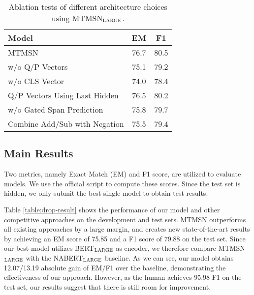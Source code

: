 \documentclass[11pt,a4paper]{article}
\newcommand\bertlarge{BERT$_{\textsc{LARGE}}$\xspace}
\newcommand\nabertlarge{NABERT$_{\textsc{LARGE}}$\xspace}
\newcommand\mtmsnlarge{MTMSN$_{\textsc{LARGE}}$\xspace}
\begin{document}
\begin{table}
	\begin{center}
		\begin{tabular}{l|cc}
			\toprule
			Model & EM & F1 \\ 
			\midrule
			MTMSN                & 76.7 & 80.5  \\
			w/o Q/P Vectors            & 75.1 &  79.2 \\
			w/o CLS Vector              & 74.0 & 78.4  \\
			Q/P Vectors Using Last Hidden          & 76.5 & 80.2  \\
w/o Gated Span Prediction	     & 75.8 & 79.7  \\
			Combine Add/Sub with Negation  & 75.5 & 79.4  \\
			\bottomrule
		\end{tabular}
		\caption{\label{table:ablation2} Ablation tests of different architecture choices using \mtmsnlarge.}
	\end{center}
\end{table}

\subsection{Main Results}
Two metrics, namely Exact Match (EM) and F1 score, are utilized to evaluate models.
We use the official script to compute these scores. 
Since the test set is hidden, we only submit the best single model to obtain test results.

Table \ref{table:drop-result} shows the performance of our model and other competitive approaches on the development and test sets. 
MTMSN outperforms all existing approaches by a large margin, and creates new state-of-the-art results by achieving an EM score of 75.85 and a F1 score of 79.88 on the test set. 
Since our best model utilizes \bertlarge as encoder, we therefore compare \mtmsnlarge with the \nabertlarge baseline.
As we can see, our model obtains 12.07/13.19 absolute gain of EM/F1 over the baseline, demonstrating the effectiveness of our approach.
However, as the human achieves 95.98 F1 on the test set, our results suggest that there is still room for improvement.
\end{document}

